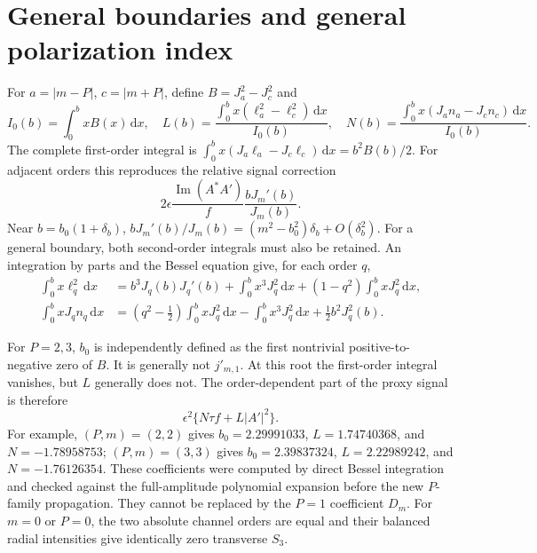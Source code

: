 \documentclass[11pt,a4paper]{article}
\begin{document}
\section{General boundaries and general polarization index}
For $a=|m-P|$, $c=|m+P|$, define $B=J_a^2-J_c^2$ and
\begin{equation}
I_0(b)=\int_0^b xB(x)\,\mathrm{d}x,\quad
L(b)=\frac{\int_0^b x(\ell_a^2-\ell_c^2)\,\mathrm{d}x}{I_0(b)},\quad
N(b)=\frac{\int_0^b x(J_an_a-J_cn_c)\,\mathrm{d}x}{I_0(b)}.
\end{equation}
The complete first-order integral is
$\int_0^b x(J_a\ell_a-J_c\ell_c)\,\mathrm{d}x=b^2B(b)/2$.
For adjacent orders this reproduces the relative signal correction
\begin{equation}
2\epsilon\frac{\operatorname{Im}(A^*A')}{f}
\frac{bJ_m'(b)}{J_m(b)}.
\end{equation}
Near $b=b_0(1+\delta_b)$,
$bJ_m'(b)/J_m(b)=(m^2-b_0^2)\delta_b+O(\delta_b^2)$.
For a general boundary, both second-order integrals must also be retained.
An integration by parts and the Bessel equation give, for each order $q$,
\begin{align}
\int_0^b x\ell_q^2\,\mathrm{d}x
&=b^3J_q(b)J_q'(b)+\int_0^b x^3J_q^2\,\mathrm{d}x
+(1-q^2)\int_0^b xJ_q^2\,\mathrm{d}x,\\
\int_0^b xJ_qn_q\,\mathrm{d}x
&=(q^2-\tfrac12)\int_0^b xJ_q^2\,\mathrm{d}x
-\int_0^b x^3J_q^2\,\mathrm{d}x+\tfrac12b^2J_q^2(b).
\end{align}

For $P=2,3$, $b_0$ is independently defined as the first nontrivial
positive-to-negative zero of $B$. It is generally not $j'_{m,1}$.
At this root the first-order integral vanishes, but $L$ generally does not.
The order-dependent part of the proxy signal is therefore
\begin{equation}
\epsilon^2\{N\tau f+L|A'|^2\}.
\end{equation}
For example, $(P,m)=(2,2)$ gives $b_0=2.29991033$,
$L=1.74740368$, and $N=-1.78958753$; $(P,m)=(3,3)$ gives
$b_0=2.39837324$, $L=2.22989242$, and $N=-1.76126354$.
These coefficients were computed by direct Bessel integration and checked
against the full-amplitude polynomial expansion before the new $P$-family
propagation. They cannot be replaced by the $P=1$ coefficient $D_m$.
For $m=0$ or $P=0$, the two absolute channel orders are equal and their
balanced radial intensities give identically zero transverse $S_3$.
\end{document}
